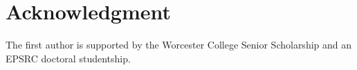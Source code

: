 \documentclass[journal]{IEEEtran}
\theoremstyle{remark}
\theoremstyle{definition}
\begin{document}
\appendices


\section*{Acknowledgment}

The first author is supported by the Worcester College Senior Scholarship and an EPSRC doctoral studentship.  



\ifCLASSOPTIONcaptionsoff
  \newpage
\fi








%


% 
\end{document}
